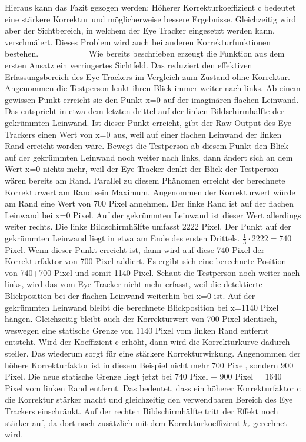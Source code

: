 Hieraus kann das Fazit gezogen werden: Höherer Korrekturkoeffizient c bedeutet eine stärkere Korrektur und möglicherweise bessere Ergebnisse. Gleichzeitig wird aber der Sichtbereich, in welchem der Eye Tracker eingesetzt werden kann, verschmälert. Dieses Problem wird auch bei anderen Korrekturfunktionen bestehen. 
=======
Wie bereits beschrieben erzeugt die Funktion aus dem ersten Ansatz ein verringertes Sichtfeld. Das reduziert den effektiven Erfassungsbereich des Eye Trackers im Vergleich zum Zustand ohne Korrektur. Angenommen die Testperson lenkt ihren Blick immer weiter nach links. Ab einem gewissen Punkt erreicht sie den Punkt x=0 auf der imaginären flachen Leinwand. Das entspricht in etwa dem letzten drittel auf der linken Bildschirmhälfte der gekrümmten Leinwand. Ist dieser Punkt erreicht, gibt der \Gls{Raw-Output} des Eye Trackers einen Wert von x=0 aus, weil auf einer flachen Leinwand der linken Rand erreicht worden wäre. Bewegt die Testperson ab diesem Punkt den Blick auf der gekrümmten Leinwand noch weiter nach links, dann ändert sich an dem Wert x=0 nichts mehr, weil der Eye Tracker denkt der Blick der Testperson wären bereits am Rand. Parallel zu diesem Phänomen erreicht der berechnete Korrekturwert am Rand sein Maximum. Angenommen der Korrekturwert würde am Rand eine Wert von 700 Pixel annehmen. Der linke Rand ist auf der flachen Leinwand bei x=0 Pixel. Auf der gekrümmten Leinwand ist dieser Wert allerdings weiter rechts. Die linke Bildschirmhälfte umfasst 2222 Pixel. Der Punkt auf der gekrümmten Leinwand liegt in etwa am Ende des ersten Drittels. $\frac{1}{3} \cdot 2222 = 740$ Pixel. Wenn dieser Punkt erreicht ist, dann wird auf diese 740 Pixel der Korrekturfaktor von 700 Pixel addiert. Es ergibt sich eine berechnete Position von 740+700 Pixel und somit 1140 Pixel. Schaut die Testperson noch weiter nach links, wird das vom Eye Tracker nicht mehr erfasst, weil die detektierte Blickposition bei der flachen Leinwand weiterhin bei x=0 ist. Auf der gekrümmten Leinwand bleibt die berechnete Blickposition bei x=1140 Pixel hängen. Gleichzeitig bleibt auch der Korrekturwert von 700 Pixel identisch, weswegen eine statische Grenze von 1140 Pixel vom linken Rand entfernt entsteht. Wird der Koeffizient c erhöht, dann wird die Korrekturkurve dadurch steiler. Das wiederum sorgt für eine stärkere Korrekturwirkung. Angenommen der höhere Korrekturfaktor ist in diesem Beispiel nicht mehr 700 Pixel, sondern 900 Pixel. Die neue statische Grenze liegt jetzt bei 740 Pixel + 900 Pixel = 1640 Pixel vom linken Rand entfernt. Das bedeutet, dass ein höherer Korrekturfaktor c die Korrektur stärker macht und gleichzeitig den verwendbaren Bereich des Eye Trackers einschränkt. Auf der rechten Bildschirmhälfte tritt der Effekt noch stärker auf, da dort noch zusätzlich mit dem Korrekturkoeffizient $k_r$ gerechnet wird. 


